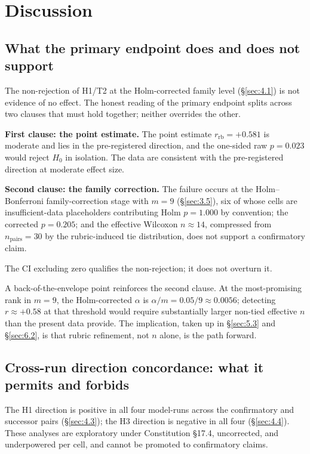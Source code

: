 \documentclass[11pt]{article}
\begin{document}
\section{Discussion}
\label{sec:5}

\subsection{What the primary endpoint does and does not support}
\label{sec:5.1}
The non-rejection of H1/T2 at the Holm-corrected family level
(\S\ref{sec:4.1}) is not evidence of no effect. The honest reading
of the primary endpoint splits across two clauses that must hold
together; neither overrides the other.

\textbf{First clause: the point estimate.} The point estimate
$r_{\text{rb}} = +0.581$ is moderate and lies in the
pre-registered direction, and the one-sided raw $p = 0.023$
would reject $H_0$ in isolation. The data are consistent with
the pre-registered direction at moderate effect size.

\textbf{Second clause: the family correction.} The failure
occurs at the Holm--Bonferroni family-correction stage with
$m = 9$ (\S\ref{sec:3.5}), six of whose cells are
insufficient-data placeholders contributing Holm $p = 1.000$ by
convention; the corrected $p = 0.205$; and the effective Wilcoxon
$n \approx 14$, compressed from $n_{\text{pairs}} = 30$ by the
rubric-induced tie distribution, does not support a confirmatory
claim.

The CI excluding zero qualifies the non-rejection; it does not
overturn it.

A back-of-the-envelope point reinforces the second clause. At the
most-promising rank in $m = 9$, the Holm-corrected $\alpha$ is
$\alpha/m = 0.05/9 \approx 0.0056$; detecting
$r \approx +0.58$ at that threshold would require substantially
larger non-tied effective $n$ than the present data provide. The implication, taken up in
\S\ref{sec:5.3} and \S\ref{sec:6.2}, is that rubric refinement,
not $n$ alone, is the path forward.

\subsection{Cross-run direction concordance: what it permits and forbids}
\label{sec:5.2}
The H1 direction is positive in all four model-runs across the
confirmatory and successor pairs (\S\ref{sec:4.3}); the H3
direction is negative in all four (\S\ref{sec:4.4}). These
analyses are exploratory under Constitution \S17.4, uncorrected,
and underpowered per cell, and cannot be promoted to confirmatory
claims.
\end{document}
